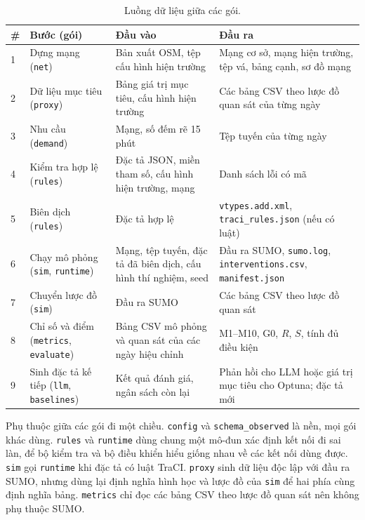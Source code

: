 \documentclass[../DoAn.tex]{subfiles}
\begin{document}
\begin{table}[H]
\centering
\small
\caption{Luồng dữ liệu giữa các gói.}
\label{table:4.2}
\begin{tabular}{|p{0.6cm}|p{3.4cm}|p{3.6cm}|p{4.9cm}|}
\hline
\textbf{\#} & \textbf{Bước (gói)} & \textbf{Đầu vào} & \textbf{Đầu ra} \\ \hline
1 & Dựng mạng (\texttt{net}) & Bản xuất OSM, tệp cấu hình hiện trường & Mạng cơ sở, mạng hiện trường, tệp vá, bảng cạnh, sơ đồ mạng \\ \hline
2 & Dữ liệu mục tiêu (\texttt{proxy}) & Bảng giá trị mục tiêu, cấu hình hiện trường & Các bảng CSV theo lược đồ quan sát của từng ngày \\ \hline
3 & Nhu cầu (\texttt{demand}) & Mạng, số đếm rẽ 15 phút & Tệp tuyến của từng ngày \\ \hline
4 & Kiểm tra hợp lệ (\texttt{rules}) & Đặc tả JSON, miền tham số, cấu hình hiện trường, mạng & Danh sách lỗi có mã \\ \hline
5 & Biên dịch (\texttt{rules}) & Đặc tả hợp lệ & \texttt{vtypes.add.xml}, \texttt{traci\_\allowbreak rules.json} (nếu có luật) \\ \hline
6 & Chạy mô phỏng (\texttt{sim}, \texttt{runtime}) & Mạng, tệp tuyến, đặc tả đã biên dịch, cấu hình thí nghiệm, seed & Đầu ra SUMO, \texttt{sumo.log}, \texttt{interventions.csv}, \texttt{manifest.json} \\ \hline
7 & Chuyển lược đồ (\texttt{sim}) & Đầu ra SUMO & Các bảng CSV theo lược đồ quan sát \\ \hline
8 & Chỉ số và điểm (\texttt{metrics}, \texttt{evaluate}) & Bảng CSV mô phỏng và quan sát của các ngày hiệu chỉnh & M1--M10, G0, $R$, $S$, tính đủ điều kiện \\ \hline
9 & Sinh đặc tả kế tiếp (\texttt{llm}, \texttt{baselines}) & Kết quả đánh giá, ngân sách còn lại & Phản hồi cho LLM hoặc giá trị mục tiêu cho Optuna; đặc tả mới \\ \hline
\end{tabular}
\end{table}

Phụ thuộc giữa các gói đi một chiều. \texttt{config} và \texttt{schema\_observed} là nền, mọi gói khác dùng. \texttt{rules} và \texttt{runtime} dùng chung một mô-đun xác định kết nối đi sai làn, để bộ kiểm tra và bộ điều khiển hiểu giống nhau về các kết nối dùng được. \texttt{sim} gọi \texttt{runtime} khi đặc tả có luật TraCI. \texttt{proxy} sinh dữ liệu độc lập với đầu ra SUMO, nhưng dùng lại định nghĩa hình học và lược đồ của \texttt{sim} để hai phía cùng định nghĩa bảng. \texttt{metrics} chỉ đọc các bảng CSV theo lược đồ quan sát nên không phụ thuộc SUMO.
\end{document}
